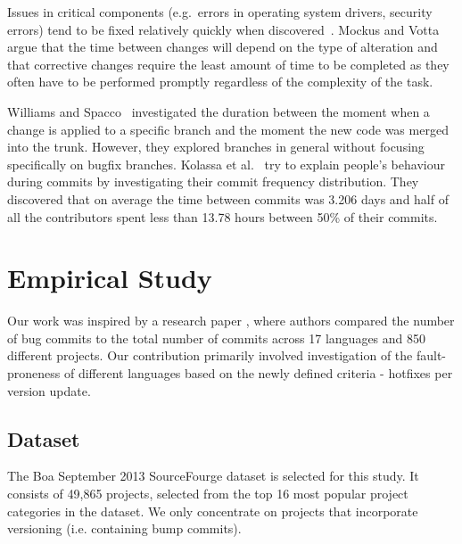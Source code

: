 \documentclass{sig-alternate}
\begin{document}
Issues in critical components (e.g.~errors in operating system drivers, security errors) tend to be fixed relatively quickly when discovered~\cite{Livshits2005}. Mockus and Votta~\cite{Mockus2000} argue that the time between changes will depend on the type of alteration and that corrective changes require the least amount of time to be completed as they often have to be performed promptly regardless of the complexity of the task.

Williams and Spacco~\cite{Williams2008} investigated the duration between the moment when a change is applied to a specific branch and the moment the new code was merged into the trunk. However, they explored branches in general without focusing specifically on bugfix branches. Kolassa et al.~\cite{Kolassa2013} try to explain people's behaviour during commits by investigating their commit frequency distribution. They discovered that on average the time between commits was 3.206 days and half of all the contributors spent less than 13.78 hours between 50\% of their commits.



\section{Empirical Study}


Our work was inspired by a research paper \cite{Ray2014}, where authors compared the number of bug commits to the total number of commits across 17 languages and 850 different projects. Our contribution primarily involved investigation of the fault-proneness of different languages based on the newly defined criteria - hotfixes per version update. 

\subsection{Dataset}
The Boa September 2013 SourceFourge dataset is selected for this study. It consists of 49,865 projects, selected from the top 16 most popular project categories in the dataset. We only concentrate on projects that incorporate versioning (i.e. containing bump commits). %
\end{document}
